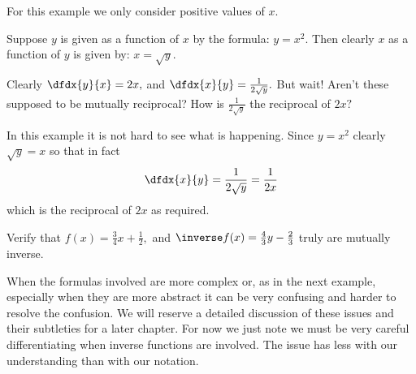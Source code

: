 \begin{myexample}
  For this example we only consider positive values of $x.$ 

  Suppose $y$ is given as a function of $x$ by the formula: $y=x^2.$
  Then clearly $x$ as a function of $y$ is given by: $x=\sqrt{y}.$

  Clearly $\dfdx{y}{x} = 2x,$ and $\dfdx{x}{y}=\frac{1}{2\sqrt{y}}.$
  But wait! Aren't these supposed to be mutually reciprocal? How is
  $\frac{1}{2\sqrt{y}}$ the reciprocal of $2x?$

  In this example it is not hard to see what is happening. Since
  $y=x^2$ clearly $\sqrt{y}=x$ so that in fact
$$
\dfdx{x}{y}=\frac{1}{2\sqrt{y}} = \frac{1}{2x}
$$
which is the reciprocal of $2x$ as required. 
\begin{embeddedproblem}{}
  Verify that \(f(x) = \frac34x+\frac12,\) and \(\inverse f(x) =
  \frac43y-\frac23\) truly are mutually inverse.
\end{embeddedproblem}\end{myexample}

When the formulas involved are more complex or, as in the next
example, especially when they are more abstract it can be very
confusing and harder to resolve the confusion. We will reserve a
detailed discussion of these issues and their subtleties for a later
chapter. For now we just note we must be very careful differentiating
when inverse functions are involved. The issue has less with our
understanding than with our notation.

